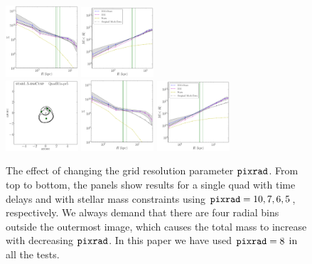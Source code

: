 \documentclass[galley,usenatbib]{mn2e}
\newcommand{\pixrad}{\ensuremath{\mathrm{\tt pixrad}}}
\begin{document}
\begin{figure}
\includegraphics[width=0.24\textwidth]{BCQuadR1a-pr6_TmS-b.pdf}
\includegraphics[width=0.24\textwidth]{BCQuadR1a-pr6_TmS-c.pdf} \\
\includegraphics[width=0.24\textwidth]{BCQuadR1a-pr5_TmS-a.pdf}
\includegraphics[width=0.24\textwidth]{BCQuadR1a-pr5_TmS-b.pdf}
\includegraphics[width=0.24\textwidth]{BCQuadR1a-pr5_TmS-c.pdf} \\
\caption{The effect of changing the grid resolution parameter \pixrad. From top
    to bottom, the panels show results for a single quad with time delays and
    with stellar mass constraints using $\pixrad = 10,7,6,5$,
    respectively. We always demand that there are four radial bins outside the
    outermost image, which causes the total mass to increase with decreasing
    \pixrad.  In this paper we have used $\pixrad = 8$ in all the
tests.}

\label{fig:pix_convergence_test}
\end{figure}
\end{document}
